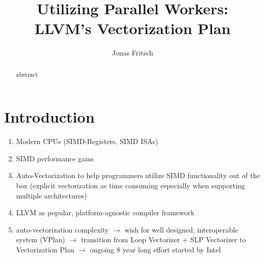 \documentclass[sigplan,11pt,nonacm]{acmart}
\begin{document}
\title{Utilizing Parallel Workers: \\LLVM's Vectorization Plan}
\author{Jonas Fritsch}

\begin{abstract}
abstract
\end{abstract}

\maketitle



\section{Introduction}
\label{sec:introduction}

\begin{enumerate}
  \item Modern CPUs (SIMD-Registers, SIMD ISAs)
  \item SIMD performance gains
  \item Auto-Vectorization to help programmers utilize SIMD functionality out of the box 
  (explicit vectorization as time consuming especially when supporting multiple architectures)
  \item LLVM as popular, platform-agnostic compiler framework~\cite{10.5555/977395.977673}
  \item auto-vectorization complexity $\rightarrow$ wish for well designed, 
  interoperable system (VPlan) $\rightarrow$ transition from Loop Vectorizer + SLP Vectorizer to 
  Vectorization Plan $\rightarrow$ ongoing 8 year long effort started by Intel
\end{enumerate}


\end{document}
